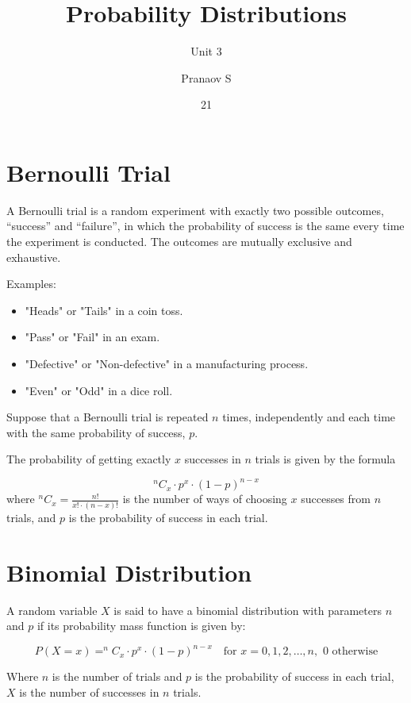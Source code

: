 \documentclass[english,course]{lecture}
\title{Probability Distributions}
\subtitle{Unit 3}
\author{Pranaov S}
\date{21}{03}{2025}
\begin{document}
\newpage

\section{Bernoulli Trial}

A Bernoulli trial is a random experiment with exactly two possible outcomes, ``success'' and ``failure'', in which the probability of success is the same every time the experiment is conducted. The outcomes are mutually exclusive and exhaustive.

Examples:
\begin{itemize}
  \item "Heads" or "Tails" in a coin toss.
  \item "Pass" or "Fail" in an exam.
  \item "Defective" or "Non-defective" in a manufacturing process.
  \item "Even" or "Odd" in a dice roll.
\end{itemize}

Suppose that a Bernoulli trial is repeated $n$ times,
independently and each time with the same probability of success, $p$.

The probability of getting exactly $x$ successes in $n$ trials is given by the formula

$$^nC_x \cdot p^x \cdot (1-p)^{n-x}$$
where $^nC_x = \frac{n!}{x! \cdot (n-x)!}$ is the number of ways of choosing $x$ successes from $n$ trials,
and $p$ is the probability of success in each trial.


\section{Binomial Distribution}

A random variable $X$ is said to have a binomial distribution with parameters $n$ and $p$ if its probability mass function is given by:

$$ P(X = x) = ^nC_x \cdot p^x \cdot (1-p)^{n-x} \quad \text{for } x = 0, 1, 2, \ldots, n, \text{ 0 otherwise}$$

Where $n$ is the number of trials and $p$ is the probability of success in each trial, $X$ is the number of successes in $n$ trials.
\end{document}
